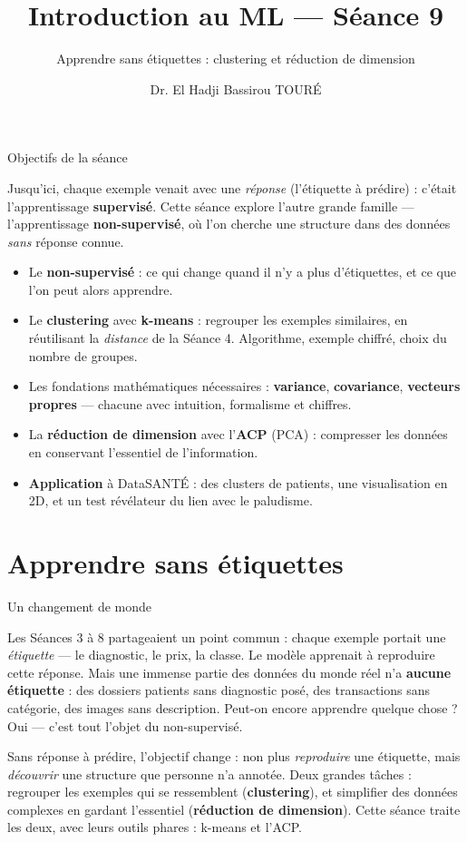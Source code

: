 \documentclass[aspectratio=169,11pt]{beamer}
\title{Introduction au ML — Séance 9}
\subtitle{Apprendre sans étiquettes : clustering et réduction de dimension}
\author{Dr. El Hadji Bassirou TOURÉ}
\institute{Département de Mathématiques et Informatique\\ Faculté des Sciences et Techniques\\ Université Cheikh Anta Diop de Dakar}
\date{}
\begin{document}
\begin{frame}\titlepage\end{frame}

\begin{frame}{Objectifs de la séance}
\begin{ucaddef}[Contenu]
{\small Jusqu'ici, chaque exemple venait avec une \emph{réponse} (l'étiquette à prédire) : c'était l'apprentissage \textbf{supervisé}. Cette séance explore l'autre grande famille — l'apprentissage \textbf{non-supervisé}, où l'on cherche une structure dans des données \emph{sans} réponse connue.}
\end{ucaddef}
\begin{itemize}\small
  \item Le \textbf{non-supervisé} : ce qui change quand il n'y a plus d'étiquettes, et ce que l'on peut alors apprendre.
  \item Le \textbf{clustering} avec \textbf{k-means} : regrouper les exemples similaires, en réutilisant la \emph{distance} de la Séance 4. Algorithme, exemple chiffré, choix du nombre de groupes.
  \item Les fondations mathématiques nécessaires : \textbf{variance}, \textbf{covariance}, \textbf{vecteurs propres} — chacune avec intuition, formalisme et chiffres.
  \item La \textbf{réduction de dimension} avec l'\textbf{ACP} (PCA) : compresser les données en conservant l'essentiel de l'information.
  \item \textbf{Application} à DataSANTÉ : des clusters de patients, une visualisation en 2D, et un test révélateur du lien avec le paludisme.
\end{itemize}
\end{frame}

\section{Apprendre sans étiquettes}

\begin{frame}{Un changement de monde}
\begin{ucadfront}
{\small Les Séances 3 à 8 partageaient un point commun : chaque exemple portait une \emph{étiquette} — le diagnostic, le prix, la classe. Le modèle apprenait à reproduire cette réponse. Mais une immense partie des données du monde réel n'a \textbf{aucune étiquette} : des dossiers patients sans diagnostic posé, des transactions sans catégorie, des images sans description. Peut-on encore apprendre quelque chose ? Oui — c'est tout l'objet du non-supervisé.}
\end{ucadfront}
{\small Sans réponse à prédire, l'objectif change : non plus \emph{reproduire} une étiquette, mais \emph{découvrir} une structure que personne n'a annotée. Deux grandes tâches : regrouper les exemples qui se ressemblent (\textbf{clustering}), et simplifier des données complexes en gardant l'essentiel (\textbf{réduction de dimension}). Cette séance traite les deux, avec leurs outils phares : k-means et l'ACP.}
\end{frame}
\end{document}
